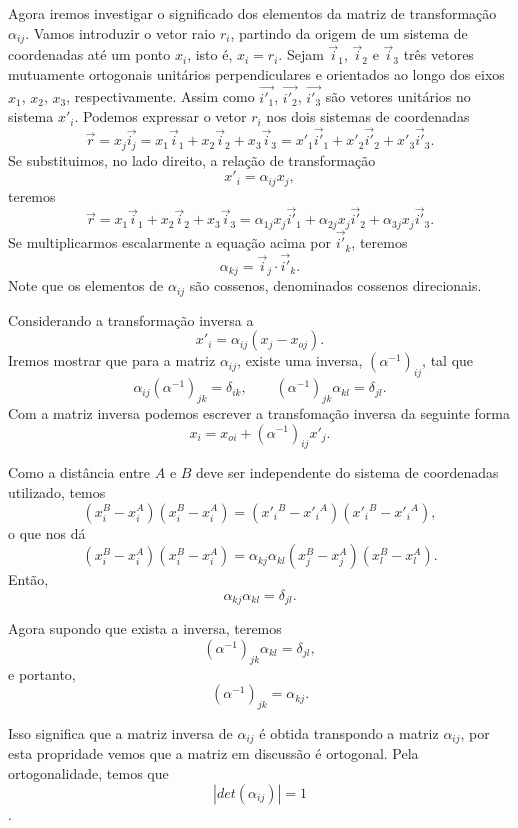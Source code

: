 Agora iremos investigar o significado dos elementos da matriz de transforma\c{c}\~ao
$\alpha_{ij}$. Vamos introduzir o vetor raio $r_{i}$, partindo da
origem de um sistema de coordenadas at\'e um ponto $x_{i}$, isto
\'e, $x_{i}=r_{i}$. Sejam $\vec{i}_{1}$, $\vec{i}_{2}$ e
$\vec{i}_{3}$ tr\^es vetores mutuamente ortogonais unit\'arios
perpendiculares e orientados ao longo dos eixos $x_{1}$, $x_{2}$,
$x_{3}$, respectivamente. Assim como $\vec{i'_{1}}$,
$\vec{i'_{2}}$, $\vec{i'_{3}}$ s\~ao vetores unit\'arios no
sistema $x'_{i}$.
Podemos expressar o vetor $r_{i}$ nos dois sistemas de
coordenadas
\[ \vec{r}=x_{j}\vec{i_{j}}=x_{1}\vec{i}_{1}+x_{2}\vec{i}_{2}+x_{3}\vec{i}_{3}=x'_{1}\vec{i'}_{1}+
x'_{2}\vec{i'}_{2}+x'_{3}\vec{i'}_{3}.\]%
Se substituimos, no lado direito, a rela\c{c}\~ao de transforma\c{c}\~ao
\[x'_{i}=\alpha_{ij}x_{j},\]
teremos
\[\vec{r}=x_{1}\vec{i}_{1}+x_{2}\vec{i}_{2}+
x_{3}\vec{i}_{3}=\alpha_{1j}x_{j}\vec{i'}_{1}+
\alpha_{2j}x_{j}\vec{i'}_{2}+\alpha_{3j}x_{j}\vec{i'}_{3}.\]
Se multiplicarmos escalarmente a equa\c{c}\~ao acima por $\vec{i'}_{k}$, teremos
\[ \alpha_{kj}=\vec{i}_{j} \cdot \vec{i'}_{k}.\] Note que os elementos de
$\alpha_{ij}$ s\~ao cossenos, denominados cossenos direcionais.

Considerando a transforma\c{c}\~ao inversa a
\[x'_{i}=\alpha_{ij}(x_{j}-x_{oj}).\]
Iremos mostrar que para a matriz $\alpha_{ij}$, existe uma inversa,
$(\alpha^{-1})_{ij}$, tal que
\[\alpha_{ij}(\alpha^{-1})_{jk}=\delta_{ik}, \mbox{    }\mbox{    }\mbox{    }(\alpha^{-1})_{jk}\alpha_{kl}=\delta_{jl}.\]
Com a matriz inversa podemos escrever a transfoma\c{c}\~ao inversa da seguinte forma
\[x_{i}=x_{oi}+(\alpha^{-1})_{ij}x'_{j}.\]

Como a dist\^ancia entre $A$ e $B$ deve ser independente do
sistema de coordenadas utilizado, temos
\[ (x_{i}^{B}-x_{i}^{A})(x_{i}^{B}-x_{i}^{A})=(x'_i{}^{B}-x'_i{}^{A})(x'_i{}^{B}-x'_i{}^{A}),\]
o que nos d\'a
\[ (x_{i}^{B}-x_{i}^{A})(x_{i}^{B}-x_{i}^{A})=\alpha_{kj}\alpha_{kl}(x_{j}^{B}-x_{j}^{A})(x_{l}^{B}-x_{l}^{A}).\]
Ent\~ao,
\[ \alpha_{kj}\alpha_{kl}=\delta_{jl}.\]

Agora supondo que exista a inversa, teremos
\[(\alpha^{-1})_{jk}\alpha_{kl}=\delta_{jl},\]
e portanto,
\[(\alpha^{-1})_{jk}=\alpha_{kj}.\]

Isso significa que a matriz inversa de $\alpha_{ij}$ \'e obtida
transpondo a matriz $\alpha_{ij}$, por esta propridade vemos que a
matriz em discuss\~ao \'e ortogonal. Pela ortogonalidade, temos
que
\[|det(\alpha_{ij})|=1\].

